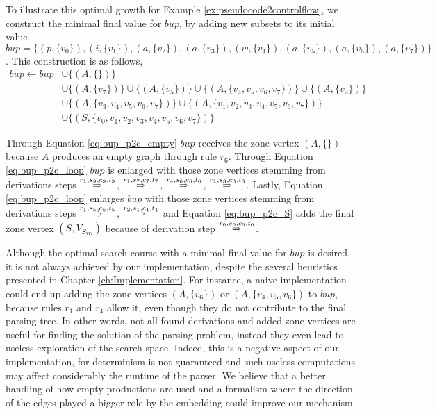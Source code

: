 To illustrate this optimal growth for Example \ref{ex:pseudocode2controlflow}, we construct the minimal final value for $bup$, by adding new subsets to its initial value $bup = \{ (p,\{v_0\}), (i,\{v_1\}), (a,\{v_2\}), (a,\{v_3\}), (w,\{v_4\}), (a,\{v_5\}), (a,\{v_6\}), (a,\{v_7\}) \}$. This construction is as follows,
\begin{align}
	\label{eq:bup_p2c_empty}
	bup \gets bup & \cup \{ (A, \{\}) \} \\
	\label{eq:bup_p2c_loop}
	& \cup \{ (A,\{v_7\}) \} \cup \{ (A,\{v_5\}) \} \cup \{ (A,\{v_4,v_5,v_6,v_7\}) \} \cup \{ (A,\{v_2\}) \} \\
	\label{eq:bup_p2c_if}
	& \cup \{ (A,\{v_3,v_4,v_5,v_6,v_7\}) \} \cup \{ (A, \{v_1,v_2,v_3,v_4,v_5,v_6,v_7\}) \} \\
	\label{eq:bup_p2c_S}
	& \cup \{ (S, \{v_0,v_1,v_2,v_3,v_4,v_5,v_6,v_7\}) \}
\end{align}

Through Equation \ref{eq:bup_p2c_empty} $bup$ receives the zone vertex $(A, \{\})$ because $A$ produces an empty graph through rule $r_6$. Through Equation \ref{eq:bup_p2c_loop} $bup$ is enlarged with those zone vertices stemming from derivations steps $\tderiv{r_1}{s_9,c_9,t_9}{}$, $\tderiv{r_1}{s_7,c_7,t_7}{}$, $\tderiv{r_4}{s_6,c_6,t_6}{}$, $\tderiv{r_1}{s_3,c_3,t_3}{}$. Lastly, Equation \ref{eq:bup_p2c_loop} enlarges $bup$ with those zone vertices stemming from derivations steps $\tderiv{r_1}{s_5,c_5,t_5}{}$, $\tderiv{r_2}{s_1,c_1,t_1}{}$ and Equation \ref{eq:bup_p2c_S} adds the final zone vertex $(S, V_{S_{TG}})$ because of derivation step $\tderiv{r_0}{s_0,c_0,t_0}{}$.

Although the optimal search course with a minimal final value for $bup$ is desired, it is not always achieved by our implementation, despite the several heuristics presented in Chapter \ref{ch:Implementation}. For instance, a naive implementation could end up adding the zone vertices $(A,\{v_6\})$ or $(A,\{v_4,v_5,v_6\}) $ to $bup$, because rules $r_1$ and $r_4$ allow it, even though they do not contribute to the final parsing tree. In other words, not all found derivations and added zone vertices are useful for finding the solution of the parsing problem, instead they even lead to useless exploration of the search space. Indeed, this is a negative aspect of our implementation, for determinism is not guaranteed and such useless computations may affect considerably the runtime of the parser. We believe that a better handling of how empty productions are used and a formalism where the direction of the edges played a bigger role by the embedding could improve our mechanism.

